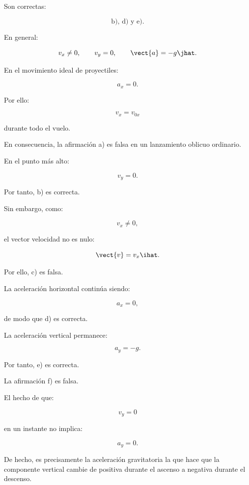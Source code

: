 \begin{respuesta}
Son correctas:

\[
\boxed{\text{b), d) y e)}}.
\]

En general:

\[
v_x\neq0,
\qquad
v_y=0,
\qquad
\vect{a}=-g\jhat.
\]
\end{respuesta}

\begin{explicacion}
En el movimiento ideal de proyectiles:

\[
a_x=0.
\]

Por ello:

\[
v_x=v_{0x}
\]

durante todo el vuelo.

En consecuencia, la afirmación a) es falsa en un lanzamiento oblicuo ordinario.

En el punto más alto:

\[
\boxed{v_y=0}.
\]

Por tanto, b) es correcta.

Sin embargo, como:

\[
v_x\neq0,
\]

el vector velocidad no es nulo:

\[
\vect{v}=v_x\ihat.
\]

Por ello, c) es falsa.

La aceleración horizontal continúa siendo:

\[
\boxed{a_x=0},
\]

de modo que d) es correcta.

La aceleración vertical permanece:

\[
\boxed{a_y=-g}.
\]

Por tanto, e) es correcta.

La afirmación f) es falsa.

El hecho de que:

\[
v_y=0
\]

en un instante no implica:

\[
a_y=0.
\]

De hecho, es precisamente la aceleración gravitatoria la que hace que la
componente vertical cambie de positiva durante el ascenso a negativa durante el
descenso.
\end{explicacion}


